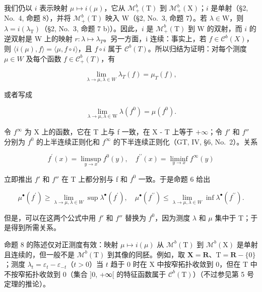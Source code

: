 我们仍以 \(i\) 表示映射 \(\mu \mapsto i(\mu)\)，它从 \(\mathcal{M}_{+}^{b}(\mathrm{T})\) 到 \(\mathcal{M}_{+}^{b}(\mathrm{X})\)；\(i\) 是单射（§2, No.~4, 命题 8），并将 \(\mathcal{M}_{+}^{b}(\mathrm{T})\) 映入 W（§2, No.~3, 命题 7）。若 \(\lambda \in \mathrm{W}\)，则 \(\lambda = i(\lambda_{\mathrm{T}})\)（§2, No.~3, 命题 7 b)）。因此，\(i\) 是 \(\mathcal{M}_{+}^{b}(\mathrm{T})\) 到 W 的双射，而 \(i\) 的逆双射是 W 上的映射 \(r : \lambda \mapsto \lambda_{T}\)。另一方面，i 连续：事实上，若 \(f \in \mathcal{C}^{b}(X)\)，则 \(\langle i(\mu), f \rangle = \langle \mu, f \circ i \rangle\)，且 \(f \circ i\) 属于 \(\mathcal{C}^{b}(T)\)。所以归结为证明：对每个测度 \(\mu \in W\) 及每个函数 \(f \in \mathcal{C}_{+}^{b}(T)\)，有

\[
\lim _ {\lambda \to \mu , \lambda \in W} \lambda_ {T} (f) = \mu_ {T} (f),
\]

或者写成

\[
\lim _ {\lambda \to \mu ,   \lambda \in \mathrm{W}} \lambda (f ^ {0}) = \mu (f ^ {0}).
\]

令 \(f^{\infty}\) 为 X 上的函数，它在 T 上与 f 一致，在 X - T 上等于 \(+\infty\)；令 \(f'\) 和 \(f''\) 分别为 \(f^{0}\) 的上半连续正则化和 \(f^{\infty}\) 的下半连续正则化（GT, IV, §6, No.~2）。关系

\[
f ^ {\prime} (x) = \limsup _ {y \to x} f ^ {0} (y), \quad f ^ {\prime \prime} (x) = \liminf _ {y \to x} f ^ {\infty} (y)
\]

立即推出 \(f'\) 和 \(f''\) 在 T 上都分别与 f 和 \(f^{0}\) 一致。于是命题 6 给出

\[
\mu^ {\bullet} (f ^ {\prime}) \geqslant \lim _ {\lambda \to \mu ,   \lambda \in W} \sup \lambda^ {\bullet} (f ^ {\prime})  , \quad \mu^ {\bullet} (f ^ {\prime \prime}) \leqslant \lim _ {\lambda \to \mu ,   \lambda \in W} \inf \lambda^ {\bullet} (f ^ {\prime \prime})  .
\]

但是，可以在这两个公式中用 \(f'\) 和 \(f''\) 替换为 \(f^{0}\)，因为测度 \(\lambda\) 和 \(\mu\) 集中于 T；于是得到所需关系。

命题 8 的陈述仅对正测度有效：映射 \(\mu \mapsto i(\mu)\) 从 \(\mathcal{M}^b (\mathrm{T})\) 到 \(\mathcal{M}^b (\mathrm{X})\) 是单射且连续的，但一般不是 \(\mathcal{M}^b (\mathrm{T})\) 到其像的同胚。例如，取 \(\mathbf{X} = \mathbf{R}\)、\(\mathrm{T} = \mathbf{R} - \{0\}\)；测度 \(\lambda_t = \varepsilon_t - \varepsilon_{-t}\)（\(t > 0\)）当 \(t\) 趋于 0 时在 X 中按窄拓扑收敛到 0，但在 T 中不按窄拓扑收敛到 0（集合 {]}0, +∞{[} 的特征函数属于 \(\mathcal{C}^b (\mathrm{T})\)）（不过参见第 5 号定理的推论）。

